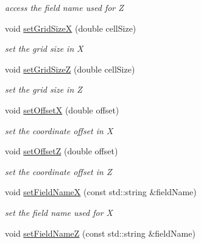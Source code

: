 \begin{DoxyCompactItemize}
\begin{DoxyCompactList}\small\item\em access the field name used for Z \item\end{DoxyCompactList}\item 
void \hyperlink{class_d_d4hep_1_1_d_d_segmentation_1_1_cartesian_grid_x_z_af1370288c6bf2194666a6faa4f6bd563}{setGridSizeX} (double cellSize)
\begin{DoxyCompactList}\small\item\em set the grid size in X \item\end{DoxyCompactList}\item 
void \hyperlink{class_d_d4hep_1_1_d_d_segmentation_1_1_cartesian_grid_x_z_aaef2c9c85c9d1325ab98690f33793ce1}{setGridSizeZ} (double cellSize)
\begin{DoxyCompactList}\small\item\em set the grid size in Z \item\end{DoxyCompactList}\item 
void \hyperlink{class_d_d4hep_1_1_d_d_segmentation_1_1_cartesian_grid_x_z_abc7142a9cda0a6eb682d4eea9e5eae7a}{setOffsetX} (double offset)
\begin{DoxyCompactList}\small\item\em set the coordinate offset in X \item\end{DoxyCompactList}\item 
void \hyperlink{class_d_d4hep_1_1_d_d_segmentation_1_1_cartesian_grid_x_z_a45d273f0fcb485427d30c465477f4c61}{setOffsetZ} (double offset)
\begin{DoxyCompactList}\small\item\em set the coordinate offset in Z \item\end{DoxyCompactList}\item 
void \hyperlink{class_d_d4hep_1_1_d_d_segmentation_1_1_cartesian_grid_x_z_a2d1d365c962d662e90e53f07980bee2c}{setFieldNameX} (const std::string \&fieldName)
\begin{DoxyCompactList}\small\item\em set the field name used for X \item\end{DoxyCompactList}\item 
void \hyperlink{class_d_d4hep_1_1_d_d_segmentation_1_1_cartesian_grid_x_z_a46cc52729cf997b7e0ba497b43476fe2}{setFieldNameZ} (const std::string \&fieldName)

\end{DoxyCompactItemize}
